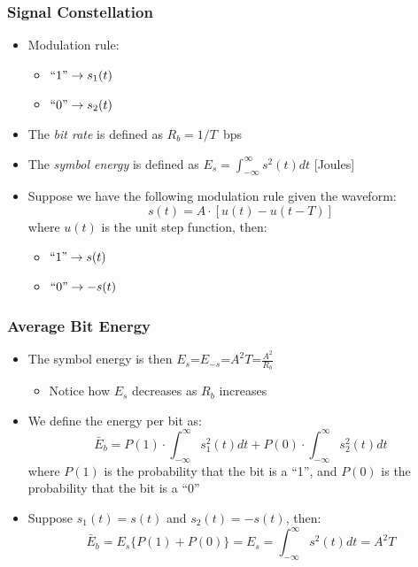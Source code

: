 \documentclass[10pt]{beamer}
\begin{document}
\frame
{
  \frametitle{Signal Constellation}

  \begin{itemize}
  \item Modulation rule:
  \begin{itemize}
    \item $``1"\rightarrow s_{1}(t)$
    \item $``0"\rightarrow s_{2}(t)$
  \end{itemize}
  \item The {\it bit rate} is defined as $R_{b}=1/T$~bps
  \item The {\it symbol energy} is defined as $E_{s}=\int_{-\infty}^{\infty}s^2(t)dt$ [Joules]
  \item Suppose we have the following modulation rule given the waveform:
  \begin{equation}
    s(t)=A\cdot[u(t)-u(t-T)]
  \end{equation}
  where $u(t)$ is the unit step function, then:
  \begin{itemize}
    \item $``1"\rightarrow{s(t)}$
    \item $``0"\rightarrow{-s(t)}$
  \end{itemize}
  \end{itemize}

}
\frame
{
  \frametitle{Average Bit Energy}

  \begin{itemize}
  \item The symbol energy is then $E_{s}$=$E_{-s}$=$A^2T$=$\frac{A^2}{R_b}$
    \begin{itemize}
        \item Notice how $E_{s}$ decreases as $R_{b}$ increases
    \end{itemize}
  \item We define the energy per bit as:
  \begin{equation}
    \bar{E}_{b}=P(1)\cdot\int_{-\infty}^{\infty}s_{1}^2(t)dt+P(0)\cdot\int_{-\infty}^{\infty}s_{2}^2(t)dt
  \end{equation}
  where $P(1)$ is the probability that the bit is a ``1'', and $P(0)$ is the probability that the bit is a ``0''
  \item Suppose $s_{1}(t)=s(t)$ and $s_{2}(t)=-s(t)$, then:
  \begin{equation}
    \bar{E}_{b}=E_{s}\{P(1)+P(0)\}=E_{s}=\int_{-\infty}^{\infty}s^2(t)dt=A^2T
  \end{equation}
  \end{itemize}

}
\end{document}
